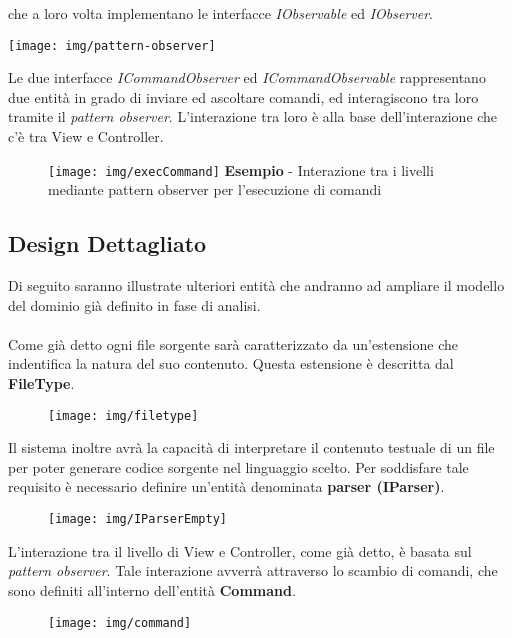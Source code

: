 \documentclass{article}
\begin{document}
  che a loro volta implementano le interfacce \textit{IObservable} ed \textit{IObserver}.
  \begin{center}
    \texttt{[image: img/pattern-observer]}
  \end{center}
  Le due interfacce \textit{ICommandObserver} ed \textit{ICommandObservable} rappresentano due entità in grado di inviare ed ascoltare comandi, ed interagiscono tra
  loro tramite il \textit{pattern observer}. L'interazione tra loro è alla base dell'interazione che c'è tra View e Controller.
  \begin{figure}[H]
    \centering
    \texttt{[image: img/execCommand]}
    \textbf{Esempio} - Interazione tra i livelli mediante pattern observer per l'esecuzione di comandi
  \end{figure}
  \subsection{Design Dettagliato}
  Di seguito saranno illustrate ulteriori entità che andranno ad ampliare il modello del dominio già definito in fase di analisi.\\
  \\Come già detto ogni file sorgente sarà caratterizzato da un'estensione che indentifica la natura del suo contenuto. Questa estensione
  è descritta dal \textbf{FileType}.
  \begin{figure}[H]
    \centering
    \texttt{[image: img/filetype]}
  \end{figure}
  Il sistema inoltre avrà la capacità di interpretare il contenuto testuale di un file per poter generare codice sorgente nel linguaggio scelto.
  Per soddisfare tale requisito è necessario definire un'entità denominata \textbf{parser (IParser)}.
  \begin{figure}[H]
    \centering
    \texttt{[image: img/IParserEmpty]}
  \end{figure}
  L'interazione tra il livello di View e Controller, come già detto, è basata sul \textit{pattern observer}. Tale interazione avverrà attraverso
  lo scambio di comandi, che sono definiti all'interno dell'entità \textbf{Command}.
  \begin{figure}[H]
    \centering
    \texttt{[image: img/command]}
  \end{figure}
\end{document}
